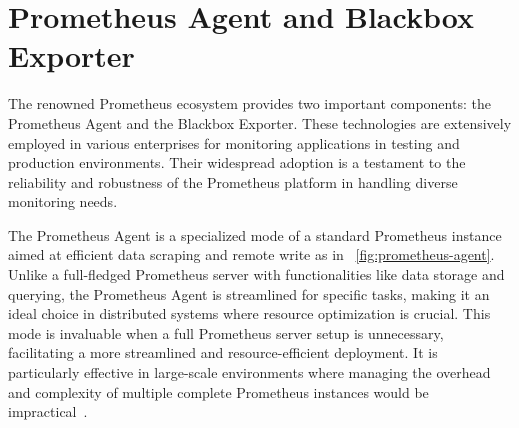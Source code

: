 \section{Prometheus Agent and Blackbox Exporter}

The renowned Prometheus ecosystem provides two important components: the Prometheus Agent and the Blackbox Exporter. These technologies are extensively employed in various enterprises for monitoring applications in testing and production environments. Their widespread adoption is a testament to the reliability and robustness of the Prometheus platform in handling diverse monitoring needs.

The Prometheus Agent is a specialized mode of a standard Prometheus instance aimed at efficient data scraping and remote write as in ~\autoref{fig:prometheus-agent}. Unlike a full-fledged Prometheus server with functionalities like data storage and querying, the Prometheus Agent is streamlined for specific tasks, making it an ideal choice in distributed systems where resource optimization is crucial. This mode is invaluable when a full Prometheus server setup is unnecessary, facilitating a more streamlined and resource-efficient deployment. It is particularly effective in large-scale environments where managing the overhead and complexity of multiple complete Prometheus instances would be impractical~\parencite{prometheusIntroducingPrometheusAgent}.

